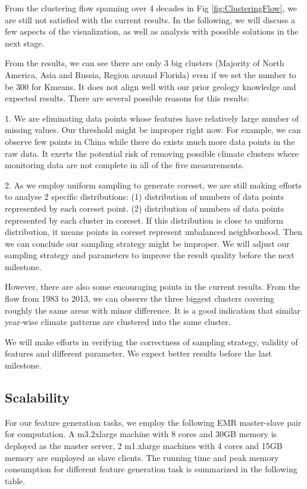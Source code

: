 From the clustering flow spanning over 4 decades in Fig \ref{fig:ClusteringFlow}, we are still not satisfied with the current results. In the following, we will discuss a few aspects of the visualization, as well as analysis with possible solutions in the next stage.

From the results, we can see there are only 3 big clusters (Majority of North America, Asia and Russia, Region around Florida) even if we set the number to be 300 for Kmeans. It does not align well with our prior geology knowledge and expected results. There are several possible reasons for this results:

1. We are eliminating data points whose features have relatively large number of missing values. Our threshold might be improper right now. For example, we can observe few points in China while there do exists much more data points in the raw data. It exerts the potential risk of removing possible climate clusters where monitoring data are not complete in all of the five measurements.

2. As we employ uniform sampling to generate coreset, we are still making efforts to analyse 2 specific distributions: (1) distribution of  numbers of data points represented by each coreset point. (2) distribution of numbers of data points represented by each cluster in coreset. If this distribution is close to uniform distribution, it means points in coreset represent unbalanced neighborhood. Then we can conclude our sampling strategy might be improper. We will adjust our sampling strategy and parameters to improve the result quality before the next milestone.

However, there are also some encouraging points in the current results. From the flow from 1983 to 2013, we can observe the three biggest clusters covering roughly the same areas with minor difference. It is a good indication that similar year-wise climate patterns are clustered into the same cluster.

We will make efforts in verifying the correctness of sampling strategy, validity of features and different parameter. We expect better results before the last milestone.

\subsection{Scalability}
For our feature generation tasks, we employ the following EMR master-slave pair for computation. A m3.2xlarge machine with 8 cores and 30GB memory is deployed as the master server, 2 m1.xlarge machines with 4 cores and	15GB memory are employed as slave clients. The running time and peak memory consumption for different feature generation task is summarized in the following table.

